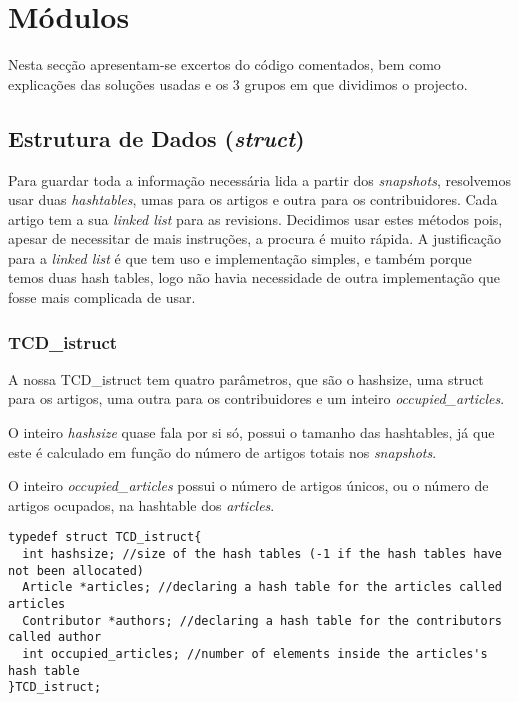 \documentclass{article}
\begin{document}
\newpage

\section{Módulos}
\par Nesta secção apresentam-se excertos do código comentados, bem como explicações das soluções usadas e os 3 grupos em que dividimos o projecto.

\subsection{Estrutura de Dados (\emph{struct})}
\par Para guardar toda a informação necessária lida a partir dos \emph{snapshots}, resolvemos usar duas \emph{hashtables}, umas para os artigos e outra para os contribuidores. Cada artigo tem a sua \emph{linked list} para as revisions.  Decidimos usar estes métodos pois, apesar de necessitar de mais instruções, a procura é muito rápida. A justificação para a \emph{linked list} é que tem uso e implementação simples, e também porque temos duas hash tables, logo não havia necessidade de outra implementação que fosse mais complicada de usar.

\subsubsection{TCD\_istruct}
\par A nossa TCD\_istruct tem quatro parâmetros, que são o hashsize, uma struct para os artigos, uma outra para os contribuidores e um inteiro \emph{occupied\_articles}.
\par O inteiro \emph{hashsize} quase fala por si só, possui o tamanho das hashtables, já que este é calculado em função do número de artigos totais nos \emph{snapshots}.
\par O inteiro \emph{occupied\_articles} possui o número de artigos únicos, ou o número de artigos ocupados, na hashtable dos \emph{articles}.

\begin{lstlisting}
typedef struct TCD_istruct{
  int hashsize; //size of the hash tables (-1 if the hash tables have not been allocated)
  Article *articles; //declaring a hash table for the articles called articles
  Contributor *authors; //declaring a hash table for the contributors called author
  int occupied_articles; //number of elements inside the articles's hash table
}TCD_istruct;
\end{lstlisting}
\end{document}
